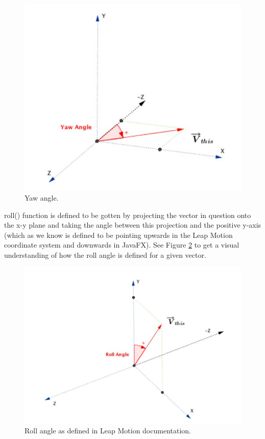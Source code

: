 \begin{figure}[H]
\begin{minipage}{0.5\textwidth}
        \includegraphics[scale=.55]{Figures/4_yawPic.JPG}
        \caption[Yaw]{Yaw angle.}
        \label{fig:yawPic}
    \end{minipage}
\end{figure}

roll() function is defined to be gotten by projecting the vector in question onto the x-y plane and taking the angle between this projection and the positive y-axis (which as we know is defined to be pointing upwards in the Leap Motion coordinate system and downwards in JavaFX). See Figure \ref{fig:rollPic} to get a visual understanding of how the roll angle is defined for a given vector.
\begin{figure}[H]
\centering
\includegraphics[scale=0.35]{Figures/4_rollPic.JPG}
\caption[Roll]{Roll angle as defined in Leap Motion documentation.}
\label{fig:rollPic}
\end{figure}



